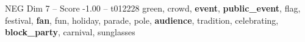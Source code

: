 \begin{textsample}{NEG Dim 7 – Score -1.00 – t012228}  \label{ex:f7_neg_034}
green, crowd, \textbf{event}, \textbf{public\_event}, flag, festival, \textbf{fan}, fun, holiday, parade, pole, \textbf{audience}, tradition, celebrating, \textbf{block\_party}, carnival, sunglasses

\end{textsample}
